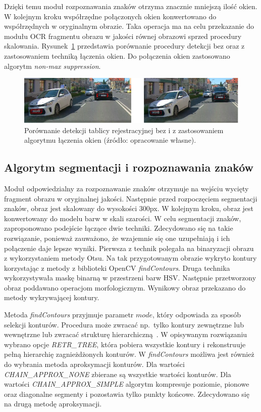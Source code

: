 Dzięki temu moduł rozpoznawania znaków otrzyma znacznie mniejszą ilość okien.
W kolejnym kroku współrzędne połączonych okien konwertowano do współrzędnych w oryginalnym obrazie.
Taka operacja ma na celu przekazanie do modułu OCR fragmentu obrazu w jakości równej obrazowi sprzed procedury skalowania.
Rysunek~\ref{fig:non_max_supression} przedstawia porównanie procedury detekcji bez oraz z zastosowaniem techniką łączenia okien.
Do połączenia okien zastosowano algorytm \emph{non-max suppression}.
\begin{figure}[!ht]
    \centering
    \includegraphics[scale=0.4]{Pictures/non_max_supression}
    \caption{Porównanie detekcji tablicy rejestracyjnej bez i z zastosowaniem algorytmu łączenia okien (źródło: opracowanie własne).}
    \label{fig:non_max_supression}
\end{figure}
\FloatBarrier

\subsection{Algorytm segmentacji i rozpoznawania znaków}
Moduł odpowiedzialny za rozpoznawanie znaków otrzymuje na wejściu wycięty fragment obrazu w oryginalnej jakości.
Następnie przed rozpoczęciem segmentacji znaków, obraz jest skalowany do wysokości 300px.
W kolejnym kroku, obraz jest konwertowany do modelu barw w skali szarości.
W celu segmentacji znaków, zaproponowano podejście łączące dwie techniki.
Zdecydowano się na takie rozwiązanie, ponieważ zauważono, że wzajemnie się one uzupełniają i ich połączenie daje lepsze wyniki.
Pierwsza z technik polegała na binaryzacji obrazu z wykorzystaniem metody Otsu.
Na tak przygotowanym obrazie wykryto kontury korzystając z metody z biblioteki OpenCV \textit{findContours}.
Druga technika wykorzystywała maskę binarną w przestrzeni barw HSV\@.
Następnie przetworzony obraz poddawano operacjom morfologicznym.
Wynikowy obraz przekazano do metody wykrywającej kontury.

Metoda \textit{findContours} przyjmuje parametr $mode$, który odpowiada za sposób selekcji konturów.
Procedura może zwracać np.\ tylko kontury zewnętrzne lub wewnętrzne lub zwracać strukturę hierarchiczną~\cite{open_cv_contours_mode}.
W opisywanym rozwiązaniu wybrano opcje \textit{RETR\_TREE}, która pobiera wszystkie kontury i rekonstruuje pełną hierarchię zagnieżdżonych konturów.
W \textit{findContours} możliwa jest również do wybrania metoda aproksymacji konturów.
Dla wartości \textit{CHAIN\_APPROX\_NONE} zbierane są wszystkie wartości konturów.
Dla wartości \textit{CHAIN\_APPROX\_SIMPLE} algorytm kompresuje poziomie, pionowe oraz diagonalne segmenty i pozostawia tylko punkty końcowe.
Zdecydowano się na drugą metodę aproksymacji.

